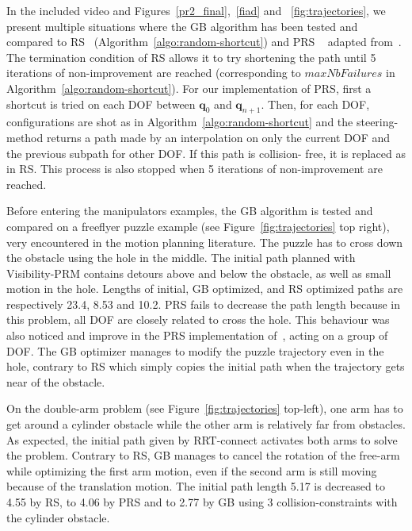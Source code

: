 \documentclass{tADR2e}
\newcommand\conf{\mathbf{q}}
\begin{document}
In the included video and Figures~\ref{pr2_final},~\ref{fiad} and
 ~\ref{fig:trajectories}, we present multiple situations where the GB algorithm has 
been tested and compared to RS~\cite{randomShortcutHPP}
(Algorithm~\ref{algo:random-shortcut}) and PRS ~\cite{partialrandomShortcutHPP} 
adapted from~\cite{Geraerts04clearancebased}.
The termination condition of RS allows it to try 
shortening the path until 5 iterations of non-improvement are reached 
(corresponding to $maxNbFailures$ in Algorithm~\ref{algo:random-shortcut}).
For our implementation of PRS, first a shortcut is tried on each DOF between 
$\conf_0$ and $\conf_{n+1}$. 
Then, for each DOF, configurations are shot as in 
Algorithm~\ref{algo:random-shortcut} and the steering-method returns a path made by 
an interpolation on only 
the current DOF and the previous subpath for other DOF. If this path is collision-
free, it is replaced as in RS. This process is also stopped when 5 iterations of 
non-improvement are reached.


\vspace{0.4cm}
Before entering the manipulators examples, the GB algorithm is tested and compared 
on a freeflyer puzzle example (see Figure~\ref{fig:trajectories} top right), very 
encountered in the motion planning literature. The puzzle has to cross down the 
obstacle using the hole in the middle. The initial path planned with Visibility-PRM 
contains detours above and below the obstacle, as well as small motion in the hole. 
Lengths of initial, GB optimized, and RS optimized paths are 
respectively 23.4, 8.53 and 10.2. PRS fails to decrease the path length because in this problem, all DOF are closely related to cross the hole. This behaviour was also noticed and improve in the PRS implementation of~\cite{Geraerts04clearancebased}, acting on a group of DOF. The GB optimizer manages to modify the puzzle trajectory even in the hole, contrary to RS which simply copies the initial path when the trajectory gets near of the obstacle.

\vspace{0.4cm}

On the double-arm problem (see Figure~\ref{fig:trajectories} top-left), one arm has 
to get around a cylinder obstacle while the 
other arm is relatively far from obstacles. As expected, the initial path given by 
RRT-connect activates both arms to solve the problem. Contrary to RS, 
GB manages to cancel the rotation of the free-arm while optimizing the 
first arm motion, even if the second arm is still moving because of the translation 
motion. The initial path length 5.17 is decreased to 4.55 by RS, to 4.06 by PRS and 
to 2.77 by GB using 3 collision-constraints with the cylinder obstacle.
\end{document}
